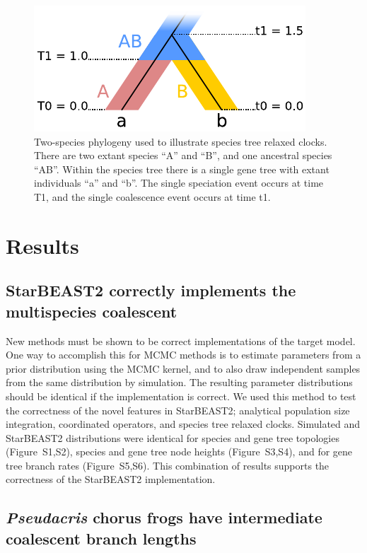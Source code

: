 \documentclass[nogrid]{MBE}%
\begin{document}
\begin{figure}[htb!]
\centering
\includegraphics[width=\columnwidth]{relaxed_clock.pdf}
\caption
{Two-species phylogeny used to illustrate species tree relaxed
clocks. There are two extant species ``A'' and ``B'', and one ancestral species ``AB''.
Within the species tree there is a single gene tree with extant individuals ``a''
and ``b''. The single speciation event occurs at time T1, and the single coalescence
event occurs at time t1.}
\label{fig:branchRateModel}
\end{figure}

\section{Results}

\subsection{StarBEAST2 correctly implements the multispecies coalescent}

New methods must be shown to be correct implementations of the
target model. One way to accomplish this for MCMC methods is to estimate
parameters from a prior distribution using the MCMC kernel, and to also draw
independent samples from the same distribution by simulation. The resulting
parameter distributions should be identical if the implementation is correct. We
used this method to test the correctness of the novel features in StarBEAST2;
analytical population size integration, coordinated operators, and species tree
relaxed clocks. Simulated and StarBEAST2 distributions were identical
for species and gene tree topologies (Figure~S1,S2), species and gene tree node
heights (Figure~S3,S4), and for gene tree branch rates (Figure~S5,S6). This
combination of results supports the correctness of the StarBEAST2
implementation.

\subsection{\textit{Pseudacris} chorus frogs have intermediate coalescent branch lengths}
\end{document}
